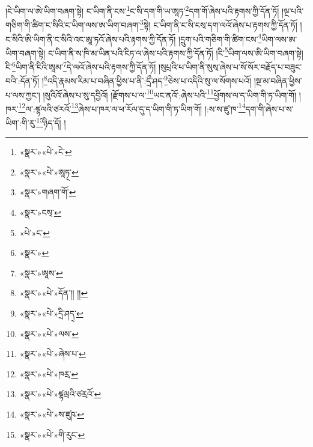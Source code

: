 །ངེ་ཡིག་ལ་ཨེ་ཡིག་བཞག་སྟེ། ང་ཡིག་ནི་ངས་\footnote{«སྣར་»«པེ་»ངེ་}ང་སི་དག་གི་ཡ་ཨཱཏ་\footnote{«སྣར་»«པེ་»ཨཱཏ྄་}དག་གོ་ཞེས་པའི་རྟགས་ཀྱི་དོན་ཏོ། །ལྔ་པའི་གཅིག་གི་ཚིག་ང་སིའི་ང་ཡིག་ལས་ཨ་ཡིག་བཞག་\footnote{«སྣར་»གཞག་གོ་}སྟེ། ང་ཡིག་ནི་ང་སི་ངས྄་དག་ལའོ་ཞེས་པ་རྟགས་ཀྱི་དོན་ཏོ། །ང་སིའི་ཨི་ཡིག་ནི་ང་སིའི་འང་ཨཱ་ཏའོ་ཞེས་པའི་རྟགས་ཀྱི་དོན་ཏོ། །དྲུག་པའི་གཅིག་གི་ཚིག་ངས་\footnote{«སྣར་»ངས྄་}ཡིག་ལས་ཨ་ཡིག་བཞག་སྟེ། ང་ཡིག་ནི་ས་ཁི་མ་ཡིན་པའི་ངིཏ་ལ་ཞེས་པའི་རྟགས་ཀྱི་དོན་ཏོ། །ངི་\footnote{«པེ་»ང་}ཡིག་ལས་ཨི་ཡིག་བཞག་སྟེ། ངི་\footnote{«སྣར་»}ཡིག་ནི་ངིའི་ཨཱམ་\footnote{«སྣར་»ཨཱས་}དེ་ལའོ་ཞེས་པའི་རྟགས་ཀྱི་དོན་ཏོ། །སུཔྲའི་པ་ཡིག་ནི་སུས྄་ཞེས་པ་སོ་སོར་བརྗོད་པ་བཟུང་བའི་:དོན་ཏོ། །\footnote{«སྣར་»«པེ་»དོན་།། །།}འདི་རྣམས་རིམ་པ་བཞིན་ཕྱིས་པ་ནི་:དྲྀ་ཤད་\footnote{«སྣར་»«པེ་»དྲི་ཤད྄་}ཅེས་པ་འདིའི་སུ་ལ་སོགས་པའོ། །སྔ་མ་བཞིན་ཕྱིས་པ་ལས་ཀྱང་། །སུའིའོ་ཞེས་པ་སུ་དབྱིའོ། །རྫོགས་པ་ལ་\footnote{«སྣར་»«པེ་»ལས་}ཡང་ནའོ་:ཞེས་པའི་\footnote{«སྣར་»«པེ་»ཞེས་པ་}ཕྱོགས་ལ་ད་ཡིག་གི་ཏ་ཡིག་གོ། །ཁར་\footnote{«སྣར་»«པེ་»ཁརྲ་}ལ་:ཛྷལའི་ཙརའོ་\footnote{«སྣར་»«པེ་»ཛྷལྲའི་ཙརྲའོ་}ཞེས་པ་ཁར་ལ་ཕ་རོལ་དུ་ད་ཡིག་གི་ཏ་ཡིག་གོ། །:ས་ས་ཛུ་ཁ་\footnote{«སྣར་»«པེ་»ས་ཛུཥ་}དག་གི་ཞེས་པ་ས་ཡིག་:གི་རུ་\footnote{«སྣར་»«པེ་»གི་རུང་}ཉིད་དོ། །
